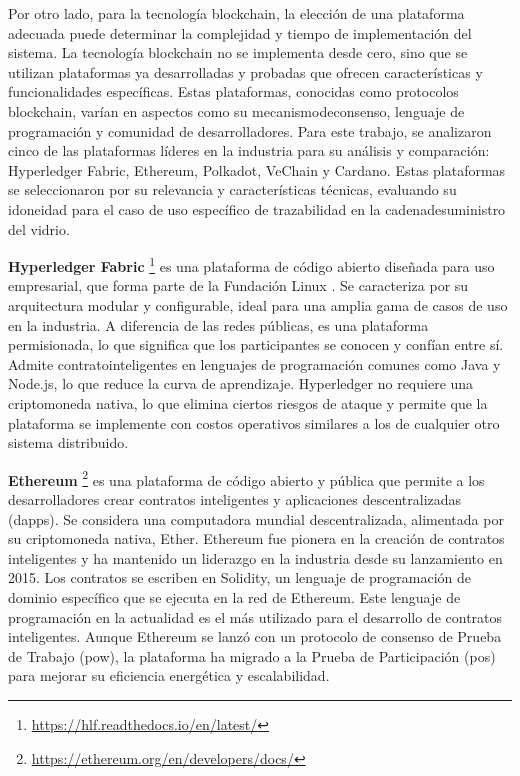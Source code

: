 Por otro lado, para la tecnología blockchain, la elección de una plataforma adecuada puede determinar la complejidad y tiempo de implementación del sistema.  La tecnología blockchain no se implementa desde cero, sino que se utilizan plataformas ya desarrolladas y probadas que ofrecen características y funcionalidades específicas. Estas plataformas, conocidas como protocolos blockchain, varían en aspectos como su \gls{mecanismodeconsenso}, lenguaje de programación y comunidad de desarrolladores. Para este trabajo, se analizaron cinco de las plataformas líderes en la industria para su análisis y comparación: Hyperledger Fabric, Ethereum, Polkadot, VeChain y Cardano. Estas plataformas se seleccionaron por su relevancia y características técnicas, evaluando su idoneidad para el caso de uso específico de trazabilidad en la \gls{cadenadesuministro} del vidrio.

\textbf{Hyperledger Fabric} \footnote{\url{https://hlf.readthedocs.io/en/latest/}}
es una plataforma de código abierto diseñada para uso empresarial, que forma parte de la Fundación Linux \cite{androulaki2018hyperledger}. Se caracteriza por su arquitectura modular y configurable, ideal para una amplia gama de casos de uso en la industria. A diferencia de las redes públicas, es una plataforma permisionada, lo que significa que los participantes se conocen y confían entre sí. Admite \glspl{contratointeligente} en lenguajes de programación comunes como Java y Node.js, lo que reduce la curva de aprendizaje. Hyperledger no requiere una \gls{criptomoneda} nativa, lo que elimina ciertos riesgos de ataque y permite que la plataforma se implemente con costos operativos similares a los de cualquier otro sistema distribuido.

\textbf{Ethereum} \footnote{\url{https://ethereum.org/en/developers/docs/}}
es una plataforma de código abierto y pública que permite a los desarrolladores crear contratos inteligentes y aplicaciones descentralizadas (\acrshort{dapps}). Se considera una computadora mundial descentralizada, alimentada por su \gls{criptomoneda} nativa, Ether. Ethereum fue pionera en la creación de contratos inteligentes y ha mantenido un liderazgo en la industria desde su lanzamiento en 2015. Los contratos se escriben en Solidity, un lenguaje de programación de dominio específico que se ejecuta en la red de Ethereum. Este lenguaje de programación en la actualidad es el más utilizado para el desarrollo de contratos inteligentes. Aunque Ethereum se lanzó con un protocolo de consenso de Prueba de Trabajo (\acrshort{pow}), la plataforma ha migrado a la Prueba de Participación (\acrshort{pos}) para mejorar su eficiencia energética y escalabilidad.


